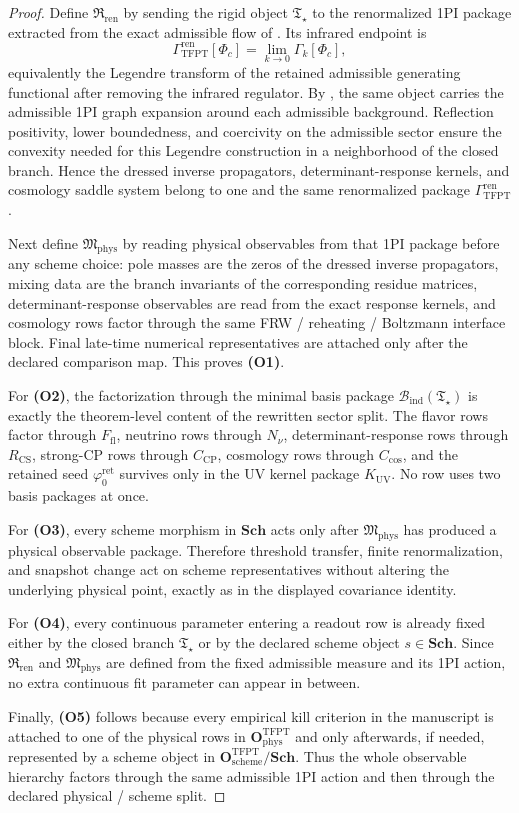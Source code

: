 \documentclass[11pt,a4paper]{article}
\theoremstyle{definition}
\theoremstyle{remark}
\newcommand{\phiz}{\varphi_0^{\mathrm{ret}}}
\newcommand{\Tstar}{\mathfrak T_{\star}}
\newcommand{\GrenTFPT}{\Gamma_{\mathrm{TFPT}}^{\mathrm{ren}}}
\newcommand{\OphysTFPT}{\mathbf O_{\mathrm{phys}}^{\mathrm{TFPT}}}
\newcommand{\OschemeTFPT}{\mathbf O_{\mathrm{scheme}}^{\mathrm{TFPT}}}
\newcommand{\SchGrp}{\mathbf{Sch}}
\newcommand{\Mphys}{\mathfrak M_{\mathrm{phys}}}
\newcommand{\Rren}{\mathfrak R_{\mathrm{ren}}}
\newcommand{\Bind}{\mathcal B_{\mathrm{ind}}}
\begin{document}
\begin{proof}
Define $\Rren$ by sending the rigid object $\Tstar$ to the renormalized 1PI package extracted from
the exact admissible flow of . Its infrared endpoint is
\[
\Gamma_{\mathrm{TFPT}}^{\mathrm{ren}}[\Phi_c]
=
\lim_{k\to0}\Gamma_k[\Phi_c],
\]
equivalently the Legendre transform of the retained admissible generating functional after removing
the infrared regulator. By , the same object carries the
admissible 1PI graph expansion around each admissible background. Reflection positivity, lower
boundedness, and coercivity on the admissible sector ensure the convexity needed for this Legendre
construction in a neighborhood of the closed branch. Hence the dressed inverse propagators,
determinant-response kernels, and cosmology saddle system belong to one and the same renormalized
package $\GrenTFPT$.

Next define $\Mphys$ by reading physical observables from that 1PI package before any scheme choice:
pole masses are the zeros of the dressed inverse propagators, mixing data are the branch invariants
of the corresponding residue matrices, determinant-response observables are read from the exact
response kernels, and cosmology rows factor through the same FRW / reheating / Boltzmann interface
block. Final late-time numerical representatives are attached only after the declared comparison
map. This proves \textbf{(O1)}.

For \textbf{(O2)}, the factorization through the minimal basis package $\Bind(\Tstar)$ is exactly
the theorem-level content of the rewritten sector split. The flavor rows factor through
$F_{\mathrm{fl}}$, neutrino rows through $N_\nu$, determinant-response rows through
$R_{\mathrm{CS}}$, strong-CP rows through $C_{\mathrm{CP}}$, cosmology rows through
$C_{\mathrm{cos}}$, and the retained seed $\phiz$ survives only in the UV kernel package
$K_{\mathrm{UV}}$. No row uses two basis packages at once.

For \textbf{(O3)}, every scheme morphism in $\SchGrp$ acts only after $\Mphys$ has produced a
physical observable package. Therefore threshold transfer, finite renormalization, and snapshot
change act on scheme representatives without altering the underlying physical point, exactly as in
the displayed covariance identity.

For \textbf{(O4)}, every continuous parameter entering a readout row is already fixed either by the
closed branch $\Tstar$ or by the declared scheme object $s\in\SchGrp$. Since $\Rren$ and $\Mphys$
are defined from the fixed admissible measure and its 1PI action, no extra continuous fit parameter
can appear in between.

Finally, \textbf{(O5)} follows because every empirical kill criterion in the manuscript is attached
to one of the physical rows in $\OphysTFPT$ and only afterwards, if needed, represented by a scheme
object in $\OschemeTFPT/\SchGrp$. Thus the whole observable hierarchy factors through the same
admissible 1PI action and then through the declared physical / scheme split.
\end{proof}
\end{document}
